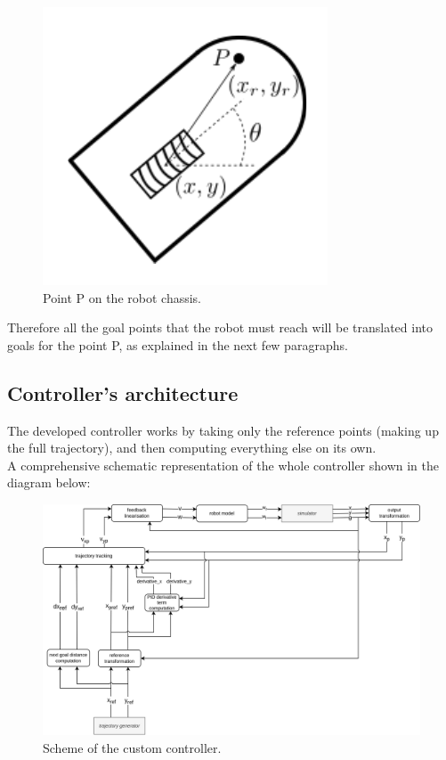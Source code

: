 \documentclass[11pt,a4paper]{article}
\begin{document}
\begin{figure}[H]
    \centering
    \includegraphics[scale=0.5]{other/point_p.png}
    \caption{Point P on the robot chassis.}
\end{figure}

Therefore all the goal points that the robot must reach will be translated into goals for the point P,
as explained in the next few paragraphs.



\subsection{Controller's architecture}

The developed controller works by taking only the reference points (making up the full trajectory),
and then computing everything else on its own.\\

A comprehensive schematic representation of the whole controller shown in the diagram below:

\begin{figure}[H]
    \centering
    \includegraphics[scale=0.16]{other/custom_controller.png}
    \caption{Scheme of the custom controller.}
\end{figure}
\end{document}
